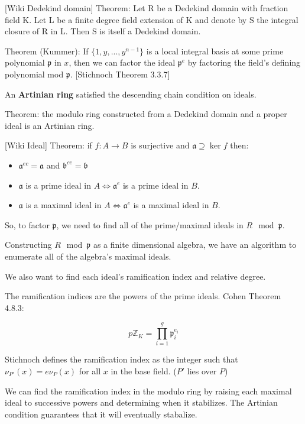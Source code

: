 [Wiki Dedekind domain] Theorem: Let R be a Dedekind domain with
fraction field K. Let L be a finite degree field extension of K and
denote by S the integral closure of R in L. Then S is itself a
Dedekind domain.

Theorem (Kummer): If $\{1,y,...,y^{n-1}\}$ is a local integral basis
at some prime polynomial $\mathfrak{p}$ in $x$, then we can factor
the ideal $\mathfrak{p}^e$ by factoring the field's defining
polynomial mod $\mathfrak{p}$. [Stichnoch Theorem 3.3.7]

An {\bf Artinian ring} satisfied the descending chain condition on ideals.

Theorem: the modulo ring constructed from a Dedekind domain and a proper ideal is an Artinian ring.

[Wiki Ideal] Theorem: if $f: A \to B$ is surjective and $ \mathfrak {a}\supseteq \ker f$ then:

\begin{itemize}
\item $\mathfrak {a}^{ec}={\mathfrak {a}}$ and ${\mathfrak {b}}^{ce}={\mathfrak {b}}$
\item ${\mathfrak {a}}$ is a prime ideal in $A \Leftrightarrow {\mathfrak  {a}}^{e}$ is a prime ideal in $B$.
\item ${\mathfrak {a}}$ is a maximal ideal in $A \Leftrightarrow  {\mathfrak  {a}}^{e}$ is a maximal ideal in $B$.
\end{itemize}

So, to factor $\mathfrak{p}$, we need to find all of the prime/maximal ideals
in $R \mod \mathfrak{p}$.

Constructing $R \mod \mathfrak{p}$ as a finite dimensional algebra,
we have an algorithm to enumerate all of the algebra's maximal ideals.

We also want to find each ideal's ramification index and relative degree.

The ramification indices are the powers of the prime ideals.  Cohen Theorem 4.8.3:

$$p {\mathbb Z}_K = \prod_{i=1}^{g} {\mathfrak p}_i^{e_i}$$

Stichnoch defines the ramification index as the integer such
that $\nu_{P'}(x) = e \nu_P(x)$ for all $x$ in the base field.
($P'$ lies over $P$)

We can find the ramification index in the modulo ring by raising each maximal
ideal to successive powers and determining when it stabilizes.  The Artinian
condition guarantees that it will eventually stabalize.

